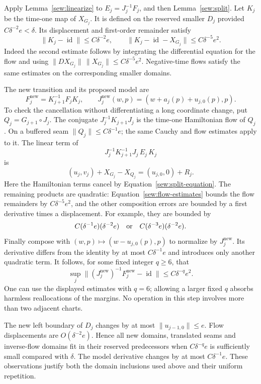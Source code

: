 Apply Lemma~\ref{sew:linearize} to $E_j=J_j^{-1}F_j$, and then
Lemma~\ref{sew:split}.  Let $K_j$ be the time-one map of $X_{G_j}$.
It is defined on the reserved smaller $D_j$ provided
$C\delta^{-2}e<\delta$.  Its displacement and first-order remainder
satisfy
\begin{equation}\label{sew:flow-estimates}
 \|K_j-\operatorname{id}\|\leq C\delta^{-2}e,\qquad
 \|K_j-\operatorname{id}-X_{G_j}\|
                              \leq C\delta^{-5}e^2.
\end{equation}
Indeed the second estimate follows by integrating the differential
equation for the flow and using
$\|DX_{G_j}\|\,\|X_{G_j}\|\leq C\delta^{-5}e^2$.
Negative-time flows satisfy the same estimates on the corresponding
smaller domains.

The new transition and its proposed model are
\[
 F_j^{\mathrm{new}}=K_{j+1}^{-1}F_jK_j,\qquad
 J_j^{\mathrm{new}}(w,p)=(w+a_j(p)+u_{j,0}(p),p).
\]
To check the cancellation without differentiating a long coordinate
change, put $Q_j=G_{j+1}\circ J_j$.  The conjugate
$J_j^{-1}K_{j+1}J_j$ is the time-one Hamiltonian flow of $Q_j$.
On a buffered seam $\|Q_j\|\leq C\delta^{-1}e$; the same Cauchy
and flow estimates apply to it.  The linear term of
\[
        J_j^{-1}K_{j+1}^{-1}J_j\, E_j\, K_j
\]
is
\[
 (u_j,v_j)+X_{G_j}-X_{Q_j}
            =(u_{j,0},0)+R_j.
\]
Here the Hamiltonian terms cancel by
Equation~\eqref{sew:split-equation}.  The remaining products are
quadratic: Equation~\eqref{sew:flow-estimates} bounds the flow
remainders by $C\delta^{-5}e^2$, and the other composition errors
are bounded by a first derivative times a displacement.  For example,
they are bounded by
\[
 C(\delta^{-1}e)(\delta^{-2}e)
       \quad\hbox{or}\quad
 C(\delta^{-3}e)(\delta^{-2}e).
\]
Finally compose with $(w,p)\mapsto(w-u_{j,0}(p),p)$ to normalize
by $J_j^{\mathrm{new}}$.  Its derivative differs from the identity
by at most $C\delta^{-1}e$ and introduces only another quadratic
term.  It follows, for some fixed integer $q\geq6$, that
\begin{equation}\label{sew:newton-bound}
 \sup_j\|(J_j^{\mathrm{new}})^{-1}F_j^{\mathrm{new}}
                                     -\operatorname{id}\|
                              \leq C\delta^{-q}e^2.
\end{equation}
One can use the displayed estimates with $q=6$; allowing a larger
fixed $q$ absorbs harmless reallocations of the margins.  No
operation in this step involves more than two adjacent charts.

The new left boundary of $D_j$ changes by at most
$\|u_{j-1,0}\|\leq e$.  Flow displacements are
$O(\delta^{-2}e)$.  Hence all new domains, translated seams and
inverse-flow domains fit in their reserved predecessors when
$C\delta^{-q}e$ is sufficiently small compared with $\delta$.
The model derivative changes by at most $C\delta^{-1}e$.
These observations justify both the domain inclusions used above and
their uniform repetition.

